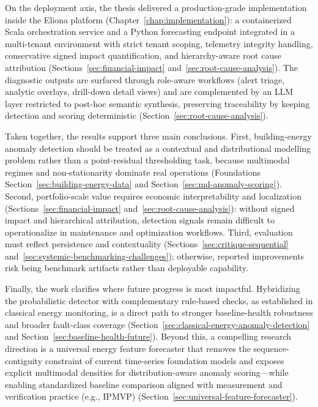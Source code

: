 On the deployment axis, the thesis delivered a production-grade implementation inside
the Eliona platform (Chapter~\ref{chap:implementation}): a containerized Scala
orchestration service and a Python forecasting endpoint integrated in a multi-tenant
environment with strict tenant scoping, telemetry integrity handling, conservative
signed impact quantification, and hierarchy-aware root cause attribution
(Sections~\ref{sec:financial-impact} and~\ref{sec:root-cause-analysis}). The diagnostic
outputs are surfaced through role-aware workflows (alert triage, analytic overlays,
drill-down detail views) and are complemented by an \ac{LLM} layer restricted to
post-hoc semantic synthesis, preserving traceability by keeping detection and scoring
deterministic (Section~\ref{sec:root-cause-analysis}).

Taken together, the results support three main conclusions. First, building-energy
anomaly detection should be treated as a contextual and distributional modelling
problem rather than a point-residual thresholding task, because multimodal regimes
and non-stationarity dominate real operations (Foundations Section~\ref{sec:building-energy-data}
and Section~\ref{sec:md-anomaly-scoring}). Second, portfolio-scale value requires
economic interpretability and localization (Sections~\ref{sec:financial-impact}
and~\ref{sec:root-cause-analysis}): without signed impact and hierarchical attribution,
detection signals remain difficult to operationalize in maintenance and optimization
workflows. Third, evaluation must reflect persistence and contextuality
(Sections~\ref{sec:critique-sequential} and~\ref{sec:systemic-benchmarking-challenges});
otherwise, reported improvements risk being benchmark artifacts rather than deployable
capability.

Finally, the work clarifies where future progress is most impactful. Hybridizing the
probabilistic detector with complementary rule-based checks, as established in
classical energy monitoring, is a direct path to stronger baseline-health robustness
and broader fault-class coverage (Section~\ref{sec:classical-energy-anomaly-detection}
and Section~\ref{sec:baseline-health-future}). Beyond this, a compelling research
direction is a universal energy feature forecaster that removes the sequence-contiguity
constraint of current time-series foundation models and exposes explicit multimodal
densities for distribution-aware anomaly scoring—while enabling standardized baseline
comparison aligned with measurement and verification practice (e.g., \ac{IPMVP})
\parencite{ipmvp-protocol} (Section~\ref{sec:universal-feature-forecaster}).